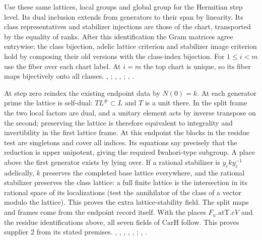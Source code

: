 Use these same lattices, local groups and global group for the Hermitian
step level. Its dual inclusion extends from generators to their span by
linearity. Its class representatives and stabilizer injections are those
of the chart, transported by the equality of ranks. After this
identification the Gram matrices agree entrywise; the class bijection,
adelic lattice criterion and stabilizer image criterion hold by composing
their old versions with the class-index bijection. For $1\le i<m$
use the fiber over each chart label. At $i=m$ the top chart is unique,
so its fiber maps bijectively onto all classes.
, ;
, ,
;
, .

At step zero reindex the existing endpoint data by $N(0)=k$.
At each generator prime the lattice is self-dual: $T L^\#\subset L$
and $T$ is a unit there. In the split frame the two local factors are
dual, and a unitary element acts by inverse transpose on the second;
preserving the lattice is therefore equivalent to integrality and
invertibility in the first lattice frame. At this endpoint the blocks
in the residue test are singletons and cover all indices. Its equations
say precisely that the reduction is upper unipotent, giving the required
Iwahori-type subgroup. A place above the first generator exists by
lying over. If a rational stabilizer is $y_c k y_c^{-1}$ adelically,
$k$ preserves the completed base lattice everywhere, and the rational
stabilizer preserves the class lattice: a full finite lattice is the
intersection in its rational space of its localizations (test the
annihilator of the class of a vector modulo the lattice).
This proves the extra lattice-stability field. The split maps and frames
come from the endpoint record itself. With the places $F_u.\mathrm{atT}.eV$
and the residue identifications above, all seven fields of
$\mathrm{CarH}$ follow. This proves supplier 2 from its stated premises.
, , ,
, ,
;
, .

